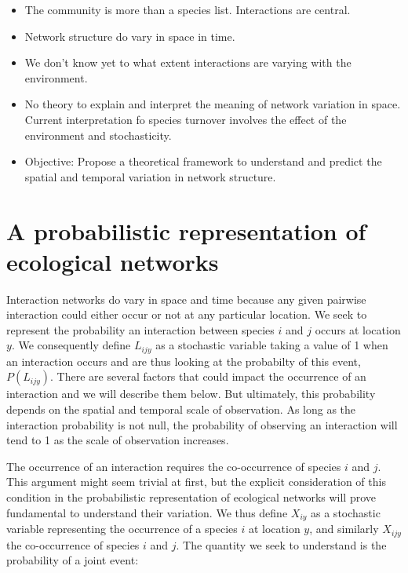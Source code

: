 \documentclass[12pt]{article}
\begin{document}
\begin{itemize}
\item The community is more than a species list. Interactions are central. \\ 

\item Network structure do vary in space in time. \\ 

\item We don't know yet to what extent interactions are varying with the
environment. \\

\item No theory to explain and interpret the meaning of network variation in space.
Current interpretation fo species turnover involves the effect of the
environment and stochasticity. \\

\item Objective: Propose a theoretical framework to understand and predict the
spatial and temporal variation in network structure.\\

\end{itemize}

\newpage
\section*{A probabilistic representation of ecological networks}

Interaction networks do vary in space and time because any given pairwise
interaction could either occur or not at any particular location. We seek to
represent the probability an interaction between species $i$ and $j$ occurs at
location $y$. We consequently define $L_{ijy}$ as a stochastic variable taking a
value of 1 when an interaction occurs and are thus looking at the probabilty of
this event, $P(L_{ijy})$. There are several factors that could impact the
occurrence of an interaction and we will describe them below. But ultimately,
this probability depends on the spatial and temporal scale of observation. As
long as the interaction probability is not null, the probability of observing an
interaction will tend to 1 as the scale of observation increases. 
	  
The occurrence of an interaction requires the co-occurrence of species
$i$ and $j$. This argument might seem trivial at first, but the explicit
consideration of this condition in the probabilistic representation of
ecological networks will prove fundamental to understand their variation. We
thus define $X_{iy}$ as a stochastic variable representing the occurrence of a
species $i$ at location $y$, and similarly $X_{ijy}$ the co-occurrence of species
$i$ and $j$. The quantity we seek to understand is the probability of a joint
event:
\end{document}
